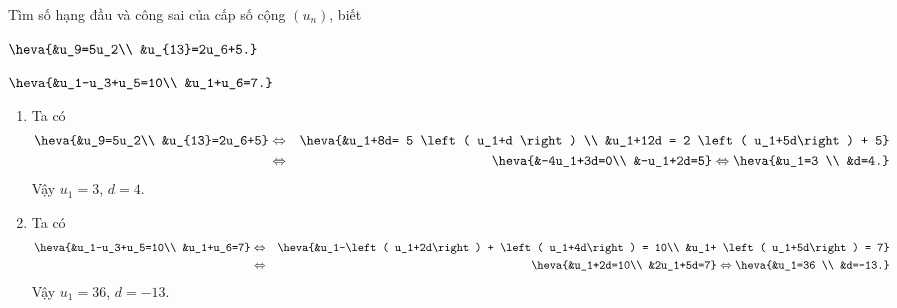 \begin{vd}%
	Tìm số hạng đầu và công sai của cấp số cộng $(u_n)$, biết
	\begin{listEX}[2]
		\item $\heva{&u_9=5u_2\\ &u_{13}=2u_6+5.}$
		\item $\heva{&u_1-u_3+u_5=10\\ &u_1+u_6=7.}$
	\end{listEX}
	\loigiai
	{
		\begin{enumerate}
			\item Ta có
			\begin{eqnarray*}
				\heva{&u_9=5u_2\\ &u_{13}=2u_6+5} &\Leftrightarrow& \heva{&u_1+8d= 5 \left( u_1+d \right) \\ &u_1+12d = 2 \left( u_1+5d\right) + 5}\\
				&\Leftrightarrow& \heva{&-4u_1+3d=0\\ &-u_1+2d=5} \Leftrightarrow \heva{&u_1=3 \\ &d=4.}
			\end{eqnarray*}
			Vậy $u_1=3$, $d=4$.
			\item Ta có 
			\begin{eqnarray*}
				\heva{&u_1-u_3+u_5=10\\ &u_1+u_6=7} &\Leftrightarrow& \heva{&u_1-\left( u_1+2d\right) + \left( u_1+4d\right) = 10\\ &u_1+ \left( u_1+5d\right) = 7}\\
				&\Leftrightarrow& \heva{&u_1+2d=10\\ &2u_1+5d=7} \Leftrightarrow \heva{&u_1=36 \\ &d=-13.}
			\end{eqnarray*}
			Vậy $u_1=36$, $d=-13$.
		\end{enumerate}
	}
\end{vd}

